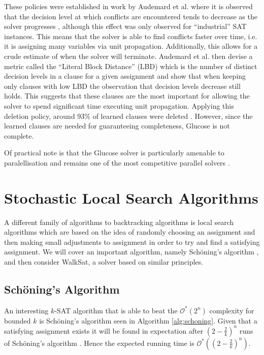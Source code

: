 These policies were established in work by Audemard et al. where it is observed that
the decision level at which conflicts are encountered
tends to decrease as the solver progresses \cite{audemard2009predicting},
although this effect was only observed for ``industrial'' SAT instances.
This means that the solver is able to find conflicts faster over time, i.e.
it is assigning many variables via unit propagation. Additionally, this allows
for a crude estimate of when the solver will terminate.
Audemard et al. then devise a metric called the ``Literal
Block Distance'' (LBD) 
which is the number of distinct decision levels in a clause
for a given assignment and show that when keeping only clauses with low LBD
the observation that decision levels decrease still holds. This suggests
that these clauses are the most important for allowing the solver to
spend significant time executing unit propagation.
Applying this deletion policy, around 93\% of learned clauses were deleted \cite{audemard2009glucose}.
However, since the learned clauses are needed for guaranteeing completeness, Glucose
is not complete.

Of practical note is that the Glucose solver is particularly
amenable to paralellisation and remains one of the most
competitive parallel solvers \cite{audemard2018glucose}.

\section{Stochastic Local Search Algorithms}
A different family of algorithms to backtracking algorithms is local search algorithms
which are based on the idea of randomly choosing an assignment and then making
small adjustments to assignment in order to try and find a satisfying assignment.
We will cover an important algorithm,
namely Sch\"oning's algorithm \cite{schoning1999probabilistic}, and then consider
WalkSat, a solver based on similar principles.

\subsection{Sch\"oning's Algorithm}

An interesting $k$-SAT algorithm that is able to beat the $\mathcal{O}^*(2^n)$
complexity for bounded $k$ is Sch\"oning's algorithm seen in Algorithm \ref{alg:schoning}.
Given that a satisfying assignment exists it will be found in expectation after
$(2 - \frac{2}{k})^n$ runs of Sch\"oning's algorithm \cite{schoning1999probabilistic}.
Hence the expected running time is $\mathcal{O}^*((2 - \frac{2}{k})^n)$.

